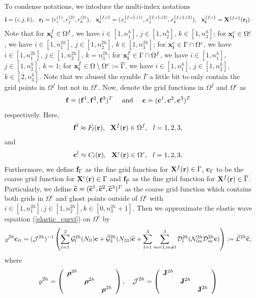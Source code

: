  To condense notations, we intoduce the multi-index notations
\[{\bf i} = (i,j,k),\ \ {\bf r}_{\bf i} = (r^{(1)}_i,r^{(2)}_j,r^{(3)}_k),\ \ {\bf x}^{\{f,c\}}_{\bf i} = (x^{\{f,c\},(1)}_i,x^{\{f,c\},(2)}_j,x^{\{f,c\},(3)}_k),\ \ {\bf x}_{\bf i}^{\{f,c\}} = {\bf X}^{\{f,c\}}({\bf r}_{\bf i}).\]
Note that for ${\bf x}^f_{\bf i}\in\Omega^f$, we have $i\in[1,n_1^h]$, $j\in[1,n_2^h]$, $k\in[1,n_3^h]$; for ${\bf x}^c_{\bf i}\in\Omega^c$, we have $i\in[1,n_1^{2h}]$, $j\in[1,n_2^{2h}]$, $k\in[1,n_3^{2h}]$; for ${\bf x}_{\bf i}^c \in \Gamma\cap\Omega^c$, we have $i\in[1,n_1^{2h}]$, $j\in[1,n_2^{2h}]$, $k = n_3^{2h}$; for ${\bf x}_{\bf i}^f \in \Gamma\cap\Omega^f$, we have $i\in[1,n_1^h]$, $j\in[1,n_2^h]$, $k = 1$; for ${\bf x}_{\bf i}^f\in \Omega \setminus \Omega^c := \overline{\Gamma}$, we have $i\in[1,n_1^h]$, $j\in[1,n_2^h]$, $k\in[2,n_3^h]$. Note that we abused the symble $\bar{\Gamma}$ a little bit to only contain the grid points in $\Omega^f$ but not in $\Omega^c$. Now, denote the grid functions in $\Omega^f$ and $\Omega^c$ as
\[{\bf f} = ({\bf f}^1, {\bf f}^2, {\bf f}^3)^T\ \ \ \ \mbox{and}\ \ \ \  {\bf c} = ({\bf c}^1, {\bf c}^2, {\bf c}^3)^T\]
respectively. Here, 
\[{\bf f}^l\approx F_l({\bf r}), \ \ {\bf X}^f({\bf r})\in\Omega^f,\ \ l=1,2,3 ,\]
and
\[{\bf c}^l \approx C_l({\bf r}),\ \ {\bf X}^c({\bf r})\in\Omega^c, \ \ l = 1,2,3.\]
Furthermore, we define ${\bf f}_{\Gamma}$ as the fine grid function for ${\bf X}^f({{\bf r}})\in\Gamma$, ${\bf c}_{\Gamma}$ to be the coarse grid function for ${\bf X}^c({{\bf r}})\in\Gamma$ and ${\bf f}_{\overline{\Gamma}}$ as the fine grid function for ${\bf X}^f({{\bf r}})\in\overline{\Gamma}$. Particularly, we define $\widetilde{\bf c} = (\widetilde{\bf c}^1,\widetilde{\bf c}^2,\widetilde{\bf c}^3)^T$ as the coarse grid function which contains both grids in $\Omega^c$ and ghost points outside of $\Omega^c$ with $i\in[1,n_1^{2h}], j\in[1,n_2^{2h}], k\in[0,n_3^{2h}+1]$. Then we approximate the elastic wave equation (\ref{elastic_curvi}) on $\Omega^c$ by
\begin{equation}\label{elastic_semi_c}
{\varrho}^{2h} {\bf c}_{tt} =( \mathcal{ J}^{2h})^{-1}\left(\sum_{l=1}^2\mathcal{G}_l^{2h}({N}_{ll}){\bf c}+\wt{\mathcal{G}}_3^{2h}({N}_{33}){\wt{\bf c}}+\sum_{l=1}^3\sum_{m=1,m\neq l}^3\mathcal{D}_l^{2h}(\mathcal{N}_{lm}^{2h}\mathcal{D}_m^{2h}{\bf c})\right) := \wt{\mathcal{L}}^{2h} {\wt {\bf c}},
\end{equation}
where 
\begin{align}\label{rho_j}
\varrho^{2h} = \left(\begin{array}{ccc}
{\bm \rho}^{2h}& ~  & ~ \\
~ & {\bm \rho}^{2h} & ~ \\
~ &~  &{\bm \rho}^{2h}\end{array}\right),\ \ \ \mathcal{J}^{2h} = \left(\begin{array}{ccc}
{\bf J}^{2h}& ~  & ~ \\
~ & {\bf J}^{2h} & ~ \\
~ &~  &{\bf J}^{2h}\end{array}\right)
\end{align}

